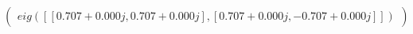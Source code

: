 \documentclass[border=1em]{standalone}
\begin{document}
$
\left(
\begin{array}{cc}
eig([[0.707+0.000j, 0.707+0.000j],[0.707+0.000j, -0.707+0.000j]])
\end{array}
\right)
$
\end{document}
